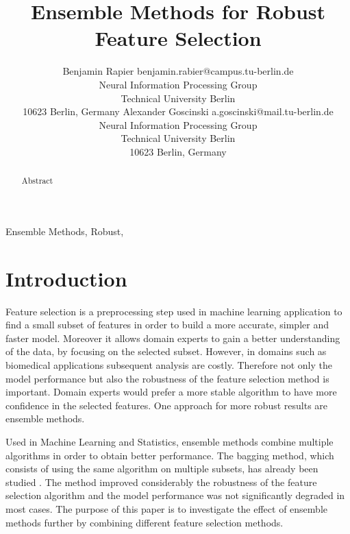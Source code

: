\documentclass[twoside,11pt]{article}
\begin{document}
\title{Ensemble Methods for Robust Feature Selection}

\author{\name Benjamin Rapier \email benjamin.rabier@campus.tu-berlin.de \\
       \addr Neural Information Processing Group\\
       Technical University Berlin\\
       10623 Berlin, Germany
       \AND
       \name Alexander Goscinski \email a.goscinski@mail.tu-berlin.de \\
       \addr Neural Information Processing Group\\
       Technical University Berlin\\
       10623 Berlin, Germany}


\maketitle

\begin{abstract}%
  Abstract
\end{abstract}

\begin{keywords}
  Ensemble Methods, Robust, 
\end{keywords}

\section{Introduction}

Feature selection is a preprocessing step used in machine learning application to find a small subset of features in order to build a more accurate, simpler and faster model. Moreover it allows domain experts to gain a better understanding of the data, by focusing on the selected subset. However, in domains such as biomedical applications subsequent analysis are costly. Therefore not only the model performance but also the robustness of the feature selection method is important. Domain experts would prefer a more stable algorithm to have more confidence in the selected features. One approach for more robust results are ensemble methods.

Used in Machine Learning and Statistics, ensemble methods combine multiple algorithms in order to obtain better performance. The bagging method, which consists of using the same algorithm on multiple subsets, has already been studied \cite{saeys2008}. The method improved considerably the robustness of the feature selection algorithm and the model performance was not significantly degraded in most cases. The purpose of this paper is to investigate the effect of ensemble methods further by combining different feature selection methods.
\end{document}
